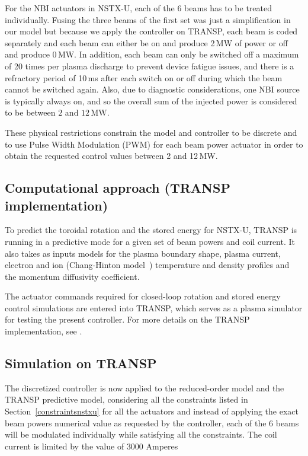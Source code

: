 \documentclass[12pt,lot, lof]{puthesis}
\begin{document}
For the NBI actuators in NSTX-U, each of the 6 beams has to be treated individually. Fusing the three beams of the first set was just a simplification in our model but because we apply the controller on TRANSP, each beam is coded separately and each beam can either be on and produce 2\,MW of power or off and produce 0\,MW.
In addition, each beam can only be switched off a maximum of 20 times per plasma discharge to prevent device fatigue issues, and there is a refractory period of 10\,ms after each switch on or off during which the beam cannot be switched again.
Also, due to diagnostic considerations, one NBI source is typically always on, and so the overall sum of the injected power is considered to be between $2$ and $12$\,MW.

These physical restrictions constrain the model and controller to be discrete and to use Pulse Width Modulation (PWM) for each beam power actuator in order to obtain the requested control values between 2 and 12\,MW.

\subsection{Computational approach  (TRANSP implementation)}

To predict the toroidal rotation and the stored energy for NSTX-U, TRANSP is running in a predictive mode for a given set of beam powers and coil current. It also takes as inputs models for the plasma boundary shape, plasma current, electron and ion (Chang-Hinton model~\cite{Changhinton}) temperature and density profiles and the momentum diffusivity coefficient.

The actuator commands required for closed-loop rotation and stored energy control simulations are entered into TRANSP, which serves as a plasma simulator for testing the present controller. For more details on the TRANSP implementation, see \cite{Boyer15}.

\subsection{Simulation on TRANSP}

The discretized controller is now applied to the reduced-order model and the TRANSP predictive model, considering all the constraints listed in Section~\ref{constraintsnstxu} for all the actuators and instead of applying the exact beam powers numerical value as requested by the controller, each of the 6 beams will be modulated individually while satisfying all the constraints. The coil current is limited by the value of $3000$ Amperes
\end{document}
